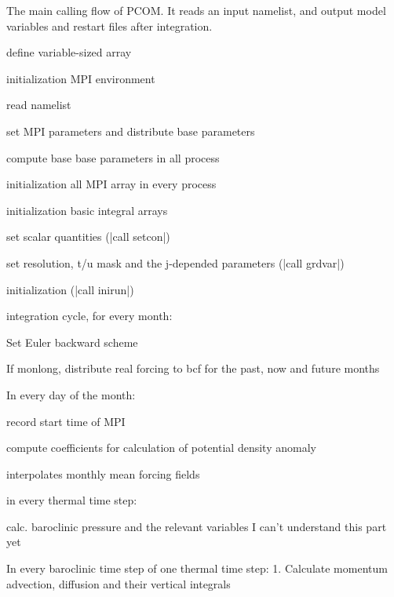 
The main calling flow of PCOM. It reads an input namelist, and
output model variables and restart files after integration.

\been

\item define variable-sized array
\item initialization MPI environment
\item read namelist
\item set MPI parameters and distribute base parameters
\item compute base base parameters in all process
\item initialization all MPI array in every process
\item initialization basic integral arrays 

\been
\item set scalar quantities (|call setcon|)
\item set resolution, t/u mask and the j-depended parameters (|call grdvar|)
\item initialization (|call inirun|)
\enen

\item integration cycle, for every month:
\been
  \item Set Euler backward scheme
  \item If monlong, distribute real forcing to bcf for the past, now and future months

  \item In every day of the month:
    \been
      \item record start time of MPI
      \item compute coefficients for calculation of potential density anomaly
      \item interpolates monthly mean forcing fields
      \item in every thermal time step:
        \been
          \item calc. baroclinic pressure and the relevant variables
          {\color{red} I can't understand this part yet}
          \item In every baroclinic time step of one thermal time step:
            1. Calculate momentum advection, diffusion and their vertical integrals
        \enen
    \enen
\enen

\enen


